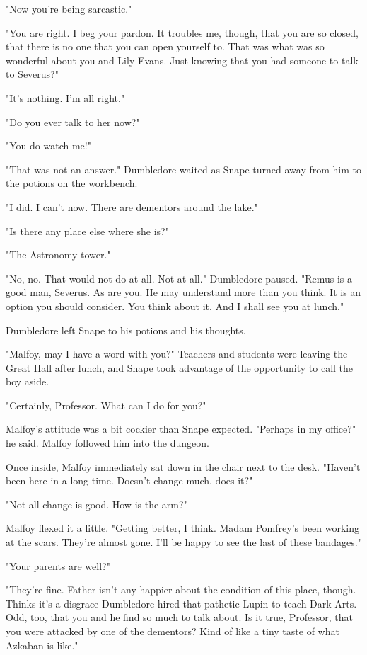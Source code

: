 "Now you're being sarcastic."

"You are right. I beg your pardon. It troubles me, though, that you are so closed, that there is no one that you can open yourself to. That was what was so wonderful about you and Lily Evans. Just knowing that you had someone to talk to{\el} Severus?"

"It's nothing. I'm all right."

"Do you ever talk to her now?"

"You do watch me!"

"That was not an answer." Dumbledore waited as Snape turned away from him to the potions on the workbench.

"I did. I can't now. There are dementors around the lake."

"Is there any place else where she is?"

"The Astronomy tower."

"No, no. That would not do at all. Not at all." Dumbledore paused. "Remus is a good man, Severus. As are you. He may understand more than you think. It is an option you should consider. You think about it. And I shall see you at lunch."

Dumbledore left Snape to his potions and his thoughts.

\sbreak

"Malfoy, may I have a word with you?" Teachers and students were leaving the Great Hall after lunch, and Snape took advantage of the opportunity to call the boy aside.

"Certainly, Professor. What can I do for you?"

Malfoy's attitude was a bit cockier than Snape expected. "Perhaps in my office?" he said. Malfoy followed him into the dungeon.

Once inside, Malfoy immediately sat down in the chair next to the desk. "Haven't been here in a long time. Doesn't change much, does it?"

"Not all change is good. How is the arm?"

Malfoy flexed it a little. "Getting better, I think. Madam Pomfrey's been working at the scars. They're almost gone. I'll be happy to see the last of these bandages."

"Your parents are well?"

"They're fine. Father isn't any happier about the condition of this place, though. Thinks it's a disgrace Dumbledore hired that pathetic Lupin to teach Dark Arts. Odd, too, that you and he find so much to talk about. Is it true, Professor, that you were attacked by one of the dementors? Kind of like a tiny taste of what Azkaban is like."

